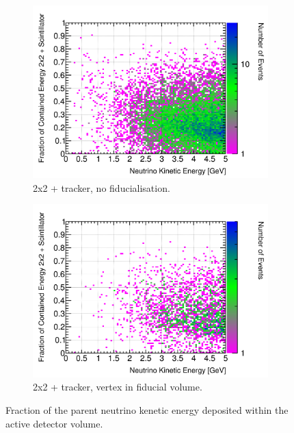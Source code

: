 \documentclass[10pt,a4paper,openany]{article}
\begin{document}
\begin{figure}[htbp]
\begin{subfigure}[b]{0.49\textwidth}
	\end{subfigure}	
	\begin{subfigure}[b]{0.49\textwidth}
		\centering
		\includegraphics[width=1.0\textwidth]{E_contained_frac_2x2_Scintillator_gap.png}
		\caption{2x2 + tracker, no fiducialisation.}
		\label{}
	\end{subfigure}	
	\hfill
	\begin{subfigure}[b]{0.49\textwidth}
		\centering
		\includegraphics[width=1.0\textwidth]{E_contained_frac_2x2_Scintillator_fiducial_gap.png}
		\caption{2x2 + tracker, vertex in fiducial volume.}
		\label{}
	\end{subfigure}
  \caption{Fraction of the parent neutrino kenetic energy deposited within the active detector volume.}
\end{figure}
\end{document}
